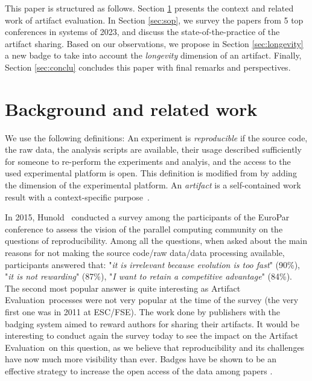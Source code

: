 \documentclass[sigconf,natbib=false]{acmart}
\newcommand{\aeval}{Artifact Evaluation}
\begin{document}
This paper is structured as follows.
Section \ref{sec:background} presents the context and related work of artifact evaluation.
In Section \ref{sec:sop}, we survey the papers from 5 top conferences in systems of 2023, and discuss the state-of-the-practice of the artifact sharing.
Based on our observations, we propose in Section \ref{sec:longevity} a new badge to take into account the \emph{longevity} dimension of an artifact.
Finally, Section \ref{sec:conclu} concludes this paper with final remarks and perspectives.

%
\section{Background and related work}\label{sec:background}

We use the following definitions:
An experiment is \emph{reproducible} if the source code, the raw data, the analysis scripts are available, their usage described sufficiently for someone to re-perform the experiments and analyis, and the access to the used experimental platform is open.
This definition is modified from \cite{rougier2019rescience} by adding the dimension of the experimental platform.
An \emph{artifact} is a self-contained work result with a context-specific purpose\ \cite{mendez2019artefacts}.

In 2015, Hunold\ \cite{hunold2015survey} conducted a survey among the participants of the EuroPar conference to assess the vision of the parallel computing community on the questions of reproducibility. 
Among all the questions, when asked about the main reasons for not making the source code/raw data/data processing available, participants answered that: "\emph{it is irrelevant because evolution is too fast}" (90\%), "\emph{it is not rewarding}" (87\%), "\emph{I want to retain a competitive advantage}" (84\%).
The second most popular answer is quite interesting as \aeval\ processes were not very popular at the time of the survey (the very first one was in 2011 at ESC/FSE).
The work done by publishers with the badging system aimed to reward authors for sharing their artifacts.
It would be interesting to conduct again the survey today to see the impact on the \aeval\ on this question, as we believe that reproducibility and its challenges have now much more visibility than ever.
Badges have be shown to be an effective strategy to increase the open access of the data among papers \cite{kidwell2016badges, rowhani2017incentives}.
\end{document}
